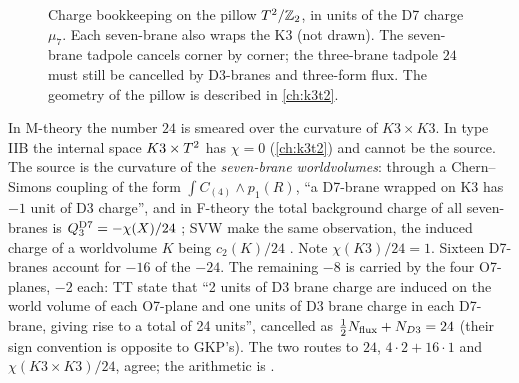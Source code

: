 \begin{figure}[t]
\centering
{}
\caption{Charge bookkeeping on the pillow $T^2/\mathbb{Z}_2$, in units of the D7 charge $\mu_7$.
Each seven-brane also wraps the K3 (not drawn). The seven-brane tadpole cancels corner by
corner; the three-brane tadpole $24$ must still be cancelled by D3-branes and three-form
flux. The geometry of the pillow is described in \cref{ch:k3t2}.}
\label{fig:tadpole:pillow}
\end{figure}

\begin{remark}\label{rem:tadpole:where}
In M-theory the number $24$ is smeared over the curvature of $K3\times K3$. In type IIB the
internal space $K3\times T^2$ has $\chi=0$ (\cref{ch:k3t2}) and cannot be the source. The source is
the curvature of the \emph{seven-brane worldvolumes}: through a Chern--Simons coupling of the
form $\int C_{(4)}\wedge p_1(R)$, ``a D7-brane wrapped on K3 has $-1$ unit of D3 charge'', and
in F-theory the total background charge of all seven-branes is
$Q_3^{\rm D7}=-\chi(X)/24$ ; SVW make the
same observation, the induced charge of a worldvolume $K$ being $c_2(K)/24$
. Note $\chi(K3)/24=1$. Sixteen D7-branes account for $-16$
of the $-24$. The remaining $-8$ is carried by the four O7-planes, $-2$ each: TT state that
``2 units of D3 brane charge are induced on the world volume of each O7-plane and one units of
D3 brane charge in each D7-brane, giving rise to a total of 24 units'', cancelled as
$\frac12N_{\rm flux}+N_{D3}=24$  (their sign
convention is opposite to GKP's). The two routes to $24$, $4\cdot2+16\cdot1$ and
$\chi(K3\times K3)/24$, agree; the arithmetic is .
\end{remark}

